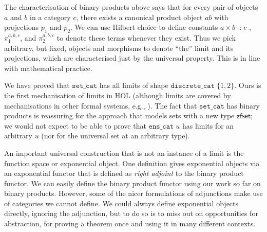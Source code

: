 \documentclass[twoside,titlepage,11pt]{article}
\begin{document}
The characterisation of binary products above says that for every pair of objects $a$ and $b$ in a category $c$, there exists a canonical product object $ab$ with projections $p_1$ and $p_2$.
We can use Hilbert choice to define constants $a\times b\operatorname{\mathtt{-:}}c$ , $\pi_1^{a,b,c}$, and $\pi_2^{a,b,c}$ to denote these terms whenever they exist.
Thus we pick arbitrary, but fixed, objects and morphisms to denote ``the'' limit and its projections, which are characterised just by the universal property.
This is in line with mathematical practice.

We have proved that $\mathtt{set\_cat}$ has all limits of shape $\mathtt{discrete\_cat}\;\{1,2\}$.
Ours is the first mechanisation of limits in HOL (although limits are covered by mechanisations in other formal systems, e.g., \cite{DBLP:conf/birthday/HuetS00,Simpson04}).
The fact that $\mathtt{set\_cat}$ has binary products is reassuring for the approach that models sets with a new type $\mathsf{zfset}$; we would not expect to be able to prove that $\mathtt{ens\_cat}\;u$ has limits for an arbitrary $u$ (nor for the universal set at an arbitrary type).

An important universal construction that is not an instance of a limit is the function space or exponential object.
One definition gives exponential objects via an exponential functor that is defined as \emph{right adjoint} to the binary product functor.
We can easily define the binary product functor using our work so far on binary products.
However, some of the nicer formulations of adjunctions make use of categories we cannot define.
We could always define exponential objects directly, ignoring the adjunction, but to do so is to miss out on opportunities for abstraction, for proving a theorem once and using it in many different contexts.
\end{document}
